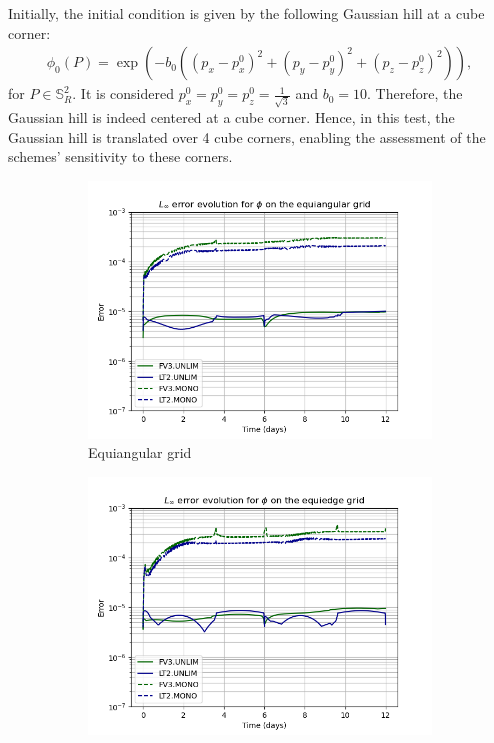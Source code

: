 \documentclass[preprint,12pt]{elsarticle}
\begin{document}
\begin{linenumbers}
Initially, the initial condition is given by the following Gaussian hill at a cube corner:
\begin{align}
\phi_0(P) = \exp(-b_0((p_x-p_x^0)^2+ (p_y-p_y^0)^2 + (p_z-p_z^0)^2)),
\end{align}
for $P \in \mathbb{S}_R^2$.
It is considered $p_x^0=p_y^0=p_z^0=\frac{1}{\sqrt{3}}$ and
$b_0=10$.
Therefore, the Gaussian hill is indeed centered at a cube corner.
Hence, in this test, the Gaussian hill is translated over 4 cube corners, enabling the assessment of the schemes' sensitivity to these corners.
\begin{figure}[!htb]
	\centering
	\begin{subfigure}{0.45\textwidth}
	\centering
	\includegraphics[width=1.1\linewidth]{tc-3_C768_linf_errors_equiangular}
	\caption{Equiangular grid\label{GH-equiangular-evol}}
    \end{subfigure}
	\begin{subfigure}{0.45\textwidth}
		\centering
		\includegraphics[width=1.1\linewidth]{tc-3_C768_linf_errors_equiedge}

\end{subfigure}
\end{figure}
\end{linenumbers}
\end{document}
